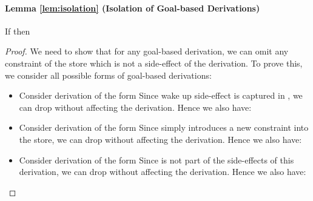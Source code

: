\documentclass{tlp}
\begin{document}
\paragraph{Lemma \ref{lem:isolation} (Isolation of Goal-based Derivations)} 

If  
then 

\begin{proof}
  We need to show that for any goal-based derivation, we can omit any constraint
  of the store which is not a side-effect of the derivation. To prove this, we
  consider all possible forms of goal-based derivations:
  
  \begin{itemize}
	  \item {} Consider derivation of the form
	           
	        \eda
	        Since wake up side-effect is captured in , we can drop  without affecting the derivation.
	        Hence we also have:
	           
	        \eda
	  \item {} Consider derivation of the form
	          \goaltranssf{\{\} \backslash \{\}} 
	        \eda
	        Since  simply introduces a new constraint  into the store, we
	        can drop  without affecting the derivation. Hence we also have:
	          \goaltranssf{\{\} \backslash \{\}} 
	        \eda
	  \item {} Consider derivation of the form
	        \eda
	        Since  is not part of the side-effects of this derivation, we can drop  
	        without affecting the derivation. Hence we also have:

\end{itemize}
\end{proof}
\end{document}
